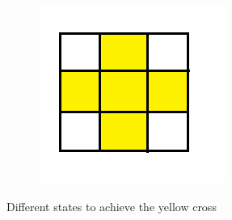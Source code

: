 \documentclass[a4paper,11pt]{kth-mag}
\begin{document}
\begin{figure}[h]
\begin{subfigure}[!b]{0.3\textwidth}
	\end{subfigure}
	\begin{subfigure}[!b]{0.3\textwidth}
		\includegraphics[width=\textwidth]{figs/step43.png}
	\end{subfigure}
	\caption{Different states to achieve the yellow cross}
	\label{fig_8}
\end{figure}
\newpage
\end{document}
